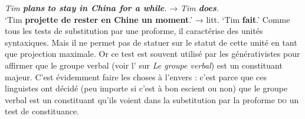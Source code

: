 {    \ea
        \textit{{Tim} \textbf{{plans}} \textbf{{to stay in China for a while}}.}     \textrm{→}   \textit{{Tim} \textbf{{does}}.}\\
        \glt   ‘Tim \textbf{projette de rester en Chine un moment}.’  \textrm{→}   litt. ‘Tim \textbf{fait}.’
    \z
    Comme tous les tests de substitution par une proforme, il caractérise des unités syntaxiques. Mais il ne permet pas de statuer sur le statut de cette unité en tant que projection maximale. Or ce test est souvent utilisé par les générativistes pour affirmer que le groupe verbal (voir l’ sur \textit{Le groupe verbal}) est un constituant majeur. C’est évidemment faire les choses à l’envers : c’est parce que ces linguistes ont décidé (peu importe si c’est à bon escient ou non) que le groupe verbal est un constituant qu’ils voient dans la substitution par la proforme \textsc{do} un test de constituance.
}
